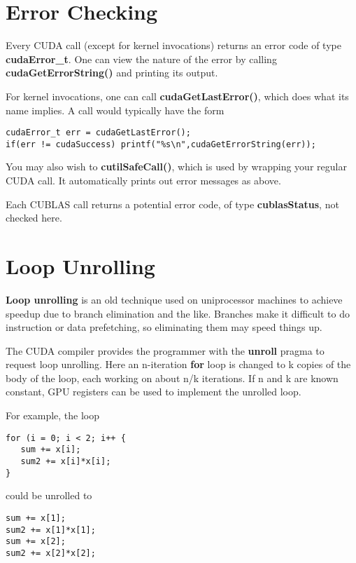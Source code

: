 \section{Error Checking}

Every CUDA call (except for kernel invocations) returns an error code of
type {\bf cudaError\_t}.  One can view the nature of the error by
calling {\bf cudaGetErrorString()} and printing its output. 

For kernel invocations, one can call {\bf cudaGetLastError()}, which
does what its name implies.  A call would typically have the form

\begin{Verbatim}[fontsize=\relsize{-2}]
cudaError_t err = cudaGetLastError();
if(err != cudaSuccess) printf("%s\n",cudaGetErrorString(err));
\end{Verbatim}

You may also wish to {\bf cutilSafeCall()}, which is used by wrapping your 
regular CUDA call.  It automatically prints out error messages as above.

Each CUBLAS call returns a potential error code, of type {\bf
cublasStatus}, not checked here.

\section{Loop Unrolling}

{\bf Loop unrolling} is an old technique used on uniprocessor machines
to achieve speedup due to branch elimination and the like.  Branches
make it difficult to do instruction or data prefetching, so eliminating
them may speed things up.

The CUDA compiler provides the programmer with the {\bf unroll} pragma
to request loop unrolling.  Here an n-iteration {\bf for} loop is
changed to k copies of the body of the loop, each working on about n/k
iterations.  If n and k are known constant, GPU registers can be used to
implement the unrolled loop.

For example, the loop

\begin{Verbatim}[fontsize=\relsize{-2}]
for (i = 0; i < 2; i++ {
   sum += x[i];
   sum2 += x[i]*x[i];
}
\end{Verbatim}

could be unrolled to

\begin{Verbatim}[fontsize=\relsize{-2}]
sum += x[1];
sum2 += x[1]*x[1];
sum += x[2];
sum2 += x[2]*x[2];
\end{Verbatim}

